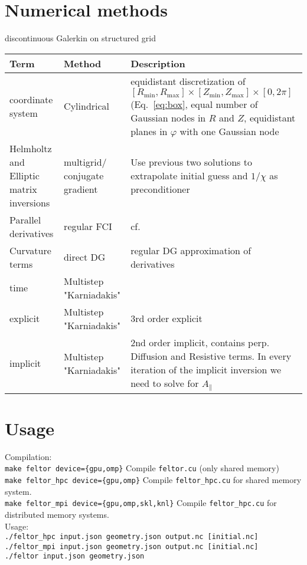 \section{Numerical methods}
discontinuous Galerkin on structured grid
\begin{longtable}{p{3cm}l>{\RaggedRight}p{8cm}}
\toprule
\rowcolor{gray!50}\textbf{Term} &  \textbf{Method} & \textbf{Description}  \\ \midrule
    coordinate system & Cylindrical & equidistant discretization of $[R_{\min},R_{\max}] \times [Z_{\min},Z_{\max}] \times [0,2\pi]$ (Eq.~\eqref{eq:box}, equal number of Gaussian nodes in $R$ and $Z$, equidistant planes in $\varphi$ with one Gaussian node \\
Helmholtz and Elliptic matrix inversions & multigrid/ conjugate gradient & Use previous two solutions to extrapolate initial guess and $1/\chi$ as preconditioner \\
Parallel derivatives & regular  FCI & cf.~\cite{Held2016,Stegmeir2017} \\
Curvature terms & direct DG & regular DG approximation of derivatives \\
time & Multistep "Karniadakis" & \\
\qquad explicit & Multistep "Karniadakis" & $3$rd order explicit\\
\qquad implicit & Multistep "Karniadakis" & $2$nd order implicit, contains perp. Diffusion and Resistive terms. In every iteration of the implicit inversion we need to solve for $A_\parallel$\\
\bottomrule
\end{longtable}
\section{Usage}
Compilation:\\
\texttt{make feltor device=\{gpu,omp\}} Compile \texttt{feltor.cu} (only shared memory)\\
\texttt{make feltor\_hpc device=\{gpu,omp\}} Compile \texttt{feltor\_hpc.cu} for shared memory system.\\
\texttt{make feltor\_mpi device=\{gpu,omp,skl,knl\}} Compile \texttt{feltor\_hpc.cu} for distributed memory systems.\\
Usage:\\
\texttt{./feltor\_hpc input.json geometry.json output.nc [initial.nc]} \\
\texttt{./feltor\_mpi input.json geometry.json output.nc [initial.nc]} \\
\texttt{./feltor input.json geometry.json } \\

